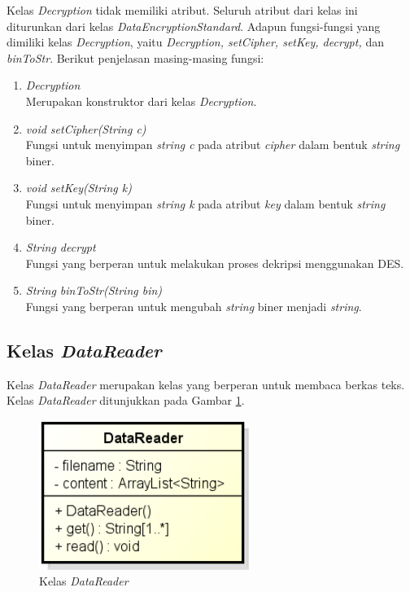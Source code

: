 Kelas \textit{Decryption} tidak memiliki atribut. Seluruh atribut dari kelas ini diturunkan dari kelas \textit{DataEncryptionStandard}. Adapun fungsi-fungsi yang dimiliki kelas \textit{Decryption}, yaitu \textit{Decryption, setCipher, setKey, decrypt,} dan \textit{binToStr}. Berikut penjelasan masing-masing fungsi:

\begin{enumerate}
	\item \textit{Decryption} \\
	Merupakan konstruktor dari kelas \textit{Decryption}.
	\item \textit{void setCipher(String c)} \\
	Fungsi untuk menyimpan \textit{string c} pada atribut \textit{cipher} dalam bentuk \textit{string} biner.
	\item \textit{void setKey(String k)} \\
	Fungsi untuk menyimpan \textit{string k} pada atribut \textit{key} dalam bentuk \textit{string} biner.
	\item \textit{String decrypt} \\
	Fungsi yang berperan untuk melakukan proses dekripsi menggunakan DES.
	\item \textit{String binToStr(String bin)} \\
	Fungsi yang berperan untuk mengubah \textit{string} biner menjadi \textit{string}.
\end{enumerate}

\subsection{Kelas \textit{DataReader}}

Kelas \textit{DataReader} merupakan kelas yang berperan untuk membaca berkas teks. Kelas \textit{DataReader} ditunjukkan pada Gambar \ref{fig:classdatareader}.

\begin{figure}[H]
	\centering
	\includegraphics[scale=0.8]{Gambar/class_data_reader}
	\caption{Kelas \textit{DataReader}}\label{fig:classdatareader}
\end{figure}

